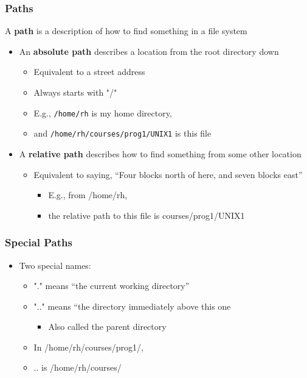 \documentclass{beamer}
\begin{document}
\begin{frame}[fragile]\frametitle{Paths}
A \textbf{path} is a description of how to find something in a file system
\begin{itemize}
    \item An \textbf{absolute path} describes a location from the root directory down
\begin{itemize}
          \item Equivalent to a street address
          \item Always starts with "/"
          \item E.g., \lstinline{/home/rh} is my home directory, 
          \item and \lstinline{/home/rh/courses/prog1/UNIX1} is this file
\end{itemize}
    \item A \textbf{relative path} describes how to find something from some other location
\begin{itemize}
          \item Equivalent to saying, “Four blocks north of here, and seven blocks east”
\begin{itemize}
          \item E.g., from /home/rh, 
          \item the relative path to this file is courses/prog1/UNIX1
\end{itemize}
\end{itemize}
\end{itemize}
\end{frame}


\begin{frame}[fragile]\frametitle{Special Paths}
\begin{itemize}
\item Two special names:
\begin{itemize}
    \item "." means “the current working directory”
    \item ".." means “the directory immediately above this one
\begin{itemize}
          \item Also called the parent directory
\end{itemize}
\bigskip
 \item In /home/rh/courses/prog1/,
 \item .. is /home/rh/courses/
\end{itemize}
\end{itemize}
\end{frame}
\end{document}
